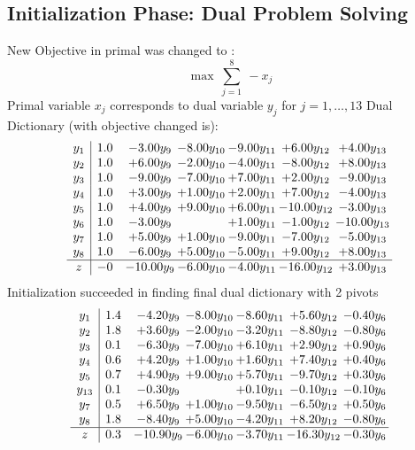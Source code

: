 \documentclass[9pt]{article}
\begin{document}
\subsection{Initialization Phase: Dual Problem Solving}
New Objective in primal was changed to : \[ \max\ \sum_{j=1}^{8}\ - x_j \] 
Primal variable $x_j$ corresponds to dual variable $y_j$ for $j = 1,\ldots,13$
Dual Dictionary (with objective changed is): 
\[\begin{array}{c| c c@{\hskip 2pt} c@{\hskip 2pt} c@{\hskip 2pt} c@{\hskip 2pt} c@{\hskip 2pt} }
 y_{1}   &  1.0 & -3.00 y_{9} & -8.00 y_{10} & -9.00 y_{11} & +  6.00 y_{12} & +  4.00 y_{13}\\
 y_{2}   &  1.0 & +  6.00 y_{9} & -2.00 y_{10} & -4.00 y_{11} & -8.00 y_{12} & +  8.00 y_{13}\\
 y_{3}   &  1.0 & -9.00 y_{9} & -7.00 y_{10} & +  7.00 y_{11} & +  2.00 y_{12} & -9.00 y_{13}\\
 y_{4}   &  1.0 & +  3.00 y_{9} & +  1.00 y_{10} & +  2.00 y_{11} & +  7.00 y_{12} & -4.00 y_{13}\\
 y_{5}   &  1.0 & +  4.00 y_{9} & +  9.00 y_{10} & +  6.00 y_{11} & -10.00 y_{12} & -3.00 y_{13}\\
 y_{6}   &  1.0 & -3.00 y_{9} &   & +  1.00 y_{11} & -1.00 y_{12} & -10.00 y_{13}\\
 y_{7}   &  1.0 & +  5.00 y_{9} & +  1.00 y_{10} & -9.00 y_{11} & -7.00 y_{12} & -5.00 y_{13}\\
 y_{8}   &  1.0 & -6.00 y_{9} & +  5.00 y_{10} & -5.00 y_{11} & +  9.00 y_{12} & +  8.00 y_{13}\\
\hline
z    &  -0 & -10.00 y_{9} & -6.00 y_{10} & -4.00 y_{11} & -16.00 y_{12} & +  3.00 y_{13}\\
\end{array}\]
Initialization succeeded in finding final dual dictionary with 2 pivots
\[\begin{array}{c| c c@{\hskip 2pt} c@{\hskip 2pt} c@{\hskip 2pt} c@{\hskip 2pt} c@{\hskip 2pt} }
 y_{1}   &  1.4 & -4.20 y_{9} & -8.00 y_{10} & -8.60 y_{11} & +  5.60 y_{12} & -0.40 y_{6}\\
 y_{2}   &  1.8 & +  3.60 y_{9} & -2.00 y_{10} & -3.20 y_{11} & -8.80 y_{12} & -0.80 y_{6}\\
 y_{3}   &  0.1 & -6.30 y_{9} & -7.00 y_{10} & +  6.10 y_{11} & +  2.90 y_{12} & +  0.90 y_{6}\\
 y_{4}   &  0.6 & +  4.20 y_{9} & +  1.00 y_{10} & +  1.60 y_{11} & +  7.40 y_{12} & +  0.40 y_{6}\\
 y_{5}   &  0.7 & +  4.90 y_{9} & +  9.00 y_{10} & +  5.70 y_{11} & -9.70 y_{12} & +  0.30 y_{6}\\
 y_{13}   &  0.1 & -0.30 y_{9} &   & +  0.10 y_{11} & -0.10 y_{12} & -0.10 y_{6}\\
 y_{7}   &  0.5 & +  6.50 y_{9} & +  1.00 y_{10} & -9.50 y_{11} & -6.50 y_{12} & +  0.50 y_{6}\\
 y_{8}   &  1.8 & -8.40 y_{9} & +  5.00 y_{10} & -4.20 y_{11} & +  8.20 y_{12} & -0.80 y_{6}\\
\hline
z    &  0.3 & -10.90 y_{9} & -6.00 y_{10} & -3.70 y_{11} & -16.30 y_{12} & -0.30 y_{6}\\
\end{array}\]
\end{document}
